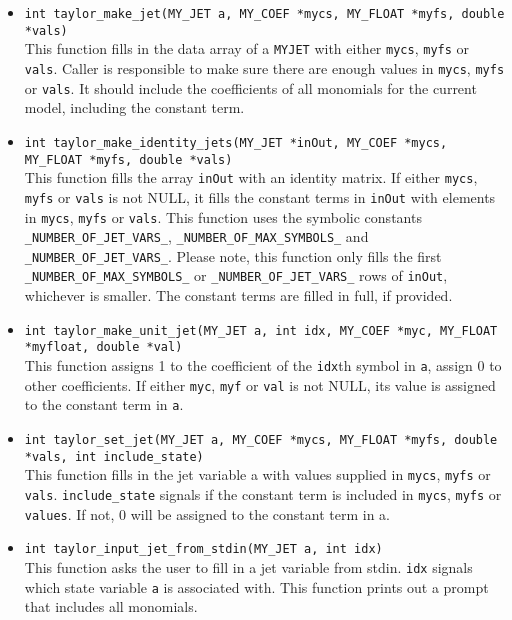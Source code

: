 \documentclass[10pt]{article}
\theoremstyle{remark}
\newcommand{\myjet}{{\tt MY\symbol{95}JET}}
\begin{document}
\begin{itemize}
\item
  {\verb+int taylor_make_jet(MY_JET a, MY_COEF *mycs, MY_FLOAT *myfs, double *vals)+
    \\ This function fills in the data array of a \myjet{} with either
    \verb+mycs+, \verb+myfs+ or \verb+vals+. Caller is responsible to
    make sure there are enough values in \verb+mycs+, \verb+myfs+ or
    \verb+vals+. It should include the coefficients of all monomials
    for the current model, including the constant term.}
    
\item
  {\verb+int taylor_make_identity_jets(MY_JET *inOut, MY_COEF *mycs, MY_FLOAT *myfs, double *vals)+
    \\ This function fills the array \verb+inOut+ with an identity
    matrix. If either \verb+mycs+, \verb+myfs+ or \verb+vals+ is not
    NULL, it fills the constant terms in \verb+inOut+ with elements in
    \verb+mycs+, \verb+myfs+ or \verb+vals+.  This function uses the
    symbolic constants \verb+_NUMBER_OF_JET_VARS_+,
    \verb+_NUMBER_OF_MAX_SYMBOLS_+ and \verb+_NUMBER_OF_JET_VARS_+.
    Please note, this function only fills the first
    \verb+_NUMBER_OF_MAX_SYMBOLS_+ or \verb+_NUMBER_OF_JET_VARS_+ rows
    of \verb+inOut+, whichever is smaller. The constant terms are
    filled in full, if provided.}
    
\item
  {\verb+int taylor_make_unit_jet(MY_JET a, int idx, MY_COEF *myc, MY_FLOAT *myfloat, double *val)+\\ This
    function assigns 1 to the coefficient of the \verb+idx+th symbol
    in \verb+a+, assign 0 to other coefficients. If either \verb+myc+,
    \verb+myf+ or \verb+val+ is not NULL, its value is assigned to the
    constant term in \verb+a+.  }
    
\item
  {\verb+int taylor_set_jet(MY_JET a, MY_COEF *mycs, MY_FLOAT *myfs, double *vals, int include_state)+\\ This
    function fills in the jet variable a with values supplied in
    \verb+mycs+, \verb+myfs+ or \verb+vals+. \verb+include_state+
    signals if the constant term is included in \verb+mycs+,
    \verb+myfs+ or \verb+values+. If not, 0 will be assigned to the
    constant term in a. }
    
\item{\verb+int taylor_input_jet_from_stdin(MY_JET a, int idx)+\\
    This function asks the user to fill in a jet variable from stdin.
    \verb+idx+ signals which state variable \verb+a+ is associated
    with.  This function prints out a prompt that includes all
    monomials.}
    

\end{itemize}
\end{document}
